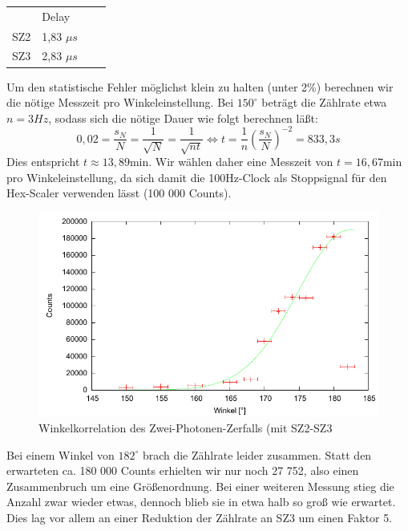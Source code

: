 \begin{center}
\begin{tabular}{llll}
 & Delay\\
SZ2 & 1,83 $\mu s$\\
SZ3 & 2,83 $\mu s$
\end{tabular}
\end{center}

Um den statistische Fehler möglichst klein zu halten (unter 2\%) berechnen wir die nötige Messzeit pro Winkeleinstellung. Bei $150^\circ$ beträgt die Zählrate etwa $n = 3 Hz$, sodass sich die nötige Dauer wie folgt berechnen läßt:
\begin{equation}
 0,02 = \frac{s_N}{N} = \frac{1}{\sqrt{N}} = \frac{1}{\sqrt{n t}} \Leftrightarrow t = \frac{1}{n}\left( \frac{s_N}{N} \right)^{-2} = 833,3s
\end{equation}
Dies entspricht $t \approx 13,89 \text{min}$. Wir wählen daher eine Messzeit von $t = 16,67 \text{min}$ pro Winkeleinstellung, da sich damit die 100Hz-Clock als Stoppsignal für den Hex-Scaler verwenden lässt (100 000 Counts). 

\begin{figure}
 \includegraphics[width=\textwidth]{Graphen/2er/erste.pdf}
 \caption{Winkelkorrelation des Zwei-Photonen-Zerfalls (mit SZ2-SZ3}
\end{figure}

Bei einem Winkel von $182^\circ$ brach die Zählrate leider zusammen. Statt den erwarteten ca. 180 000 Counts erhielten wir nur noch 27 752, also einen Zusammenbruch um eine Größenordnung. Bei einer weiteren Messung stieg die Anzahl zwar wieder etwas, dennoch blieb sie in etwa halb so groß wie erwartet. Dies lag vor allem an einer Reduktion der Zählrate an SZ3 um einen Faktor 5.  

